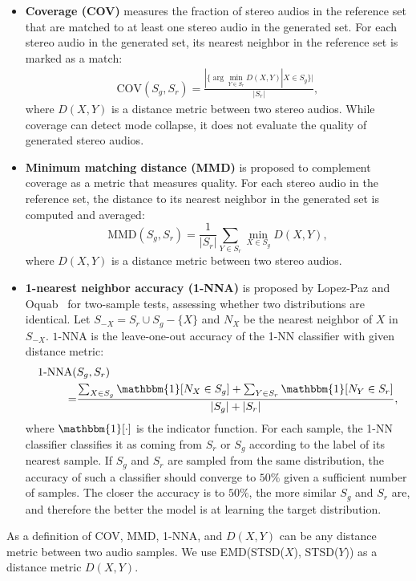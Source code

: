 \begin{itemize}
	\item\textbf{Coverage (COV)} measures the fraction of stereo audios in the reference set that are matched to at least one stereo audio in the generated set. For each stereo audio in the generated set, its nearest neighbor in the reference set is marked as a match:
	\begin{align*}
	\text{COV}(S_g, S_r) = \frac{|\{\arg\min_{Y \in S_r} D(X,Y) | X \in S_g \}|}{|S_r|},
	\end{align*}
	where $D(X,Y)$ is a distance metric between two stereo audios.
	While coverage can detect mode collapse, it does not evaluate the quality of generated stereo audios. 
	\item\textbf{Minimum matching distance (MMD)} is proposed to complement coverage as a metric that measures quality. For each stereo audio in the reference set, the distance to its nearest neighbor in the generated set is computed and averaged:
	\begin{equation}
	\text{MMD}(S_g, S_r) = \frac{1}{|S_r|}\sum_{Y\in S_r} \min_{X\in S_g} D(X,Y),\nonumber
	\end{equation}
	where $D(X,Y)$ is a distance metric between two stereo audios.
	\item \textbf{1-nearest neighbor accuracy (1-NNA)} is proposed by Lopez-Paz and Oquab~\cite{1-nna} for two-sample tests, assessing whether two distributions are identical.
	Let $S_{-X} = S_r \cup S_g - \{X\}$ and $N_X$ be the nearest neighbor of $X$ in $S_{-X}$. $1$-NNA is the leave-one-out accuracy of the 1-NN classifier with given distance metric:
	\begin{align*}
	\text{1-NNA}(&S_g, S_r) \\
	=&\frac{\sum_{X\in S_g} \mathbbm{1}[N_X \in S_g] +  \sum_{Y\in S_r} \mathbbm{1}[N_Y \in S_r]}{|S_g|+|S_r|} ,
	\end{align*}
	where $\mathbbm{1}[\cdot]$ is the indicator function.
	For each sample, the 1-NN classifier classifies it as coming from $S_r$ or $S_g$ according to the label of its nearest sample.
	If $S_g$ and $S_r$ are sampled from the same distribution, the accuracy of such a classifier should converge to $50\%$ given a sufficient number of samples. The closer the accuracy is to $50\%$, the more similar $S_g$ and $S_r$ are, and therefore the better the model is at learning the target distribution.
\end{itemize}
As a definition of COV, MMD, 1-NNA, and $D(X,Y)$ can be any distance metric between two audio samples. We use EMD(STSD($X$), STSD($Y$)) as a distance metric $D(X,Y)$.

